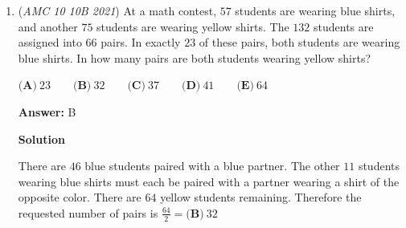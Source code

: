 \begin{enumerate}
 Note that by using the answer choices, we could automatically rule out 10.

 



\textbf{Solution 3}

Since there are an equal number of juniors and seniors on the debate team, suppose there are $x$ juniors and $x$ seniors. This number represents $25\% =\frac{1}{4}$ of the juniors and $10\%= \frac{1}{10}$ of the seniors, which tells us that there are $4x$ juniors and $10x$ seniors. There are $28$ juniors and seniors in the program altogether, so we get 
 \[10x+4x=28,\]
 \[14x=28,\]
 \[x=2.\]Which means there are $4x=8$ juniors on the debate team, $\boxed{\text{(C)} \, 8}$.

 



\textbf{Solution 4 (Elimination)}

The amount of juniors must be a multiple of $4$, since exactly $\frac{1}{4}$ of the students are on the debate team. Thus, we can immediately see that $\boxed{C}$ and $\boxed{E}$ are the only possibilities for the number of juniors. However, if there are $20$ juniors, then there are $8$ seniors, so it is not true that $1/10$ of the seniors are on the debate team, since $\frac{1}{10} \cdot 8 = \frac{4}{5}$, which is not an integer. Thus, we conclude that there are $8$ juniors, so the answer is $\boxed{C}$.

 


	\item (\textit{AMC 10 10B 2021}) At a math contest, $57$ students are wearing blue shirts, and another $75$ students are wearing yellow shirts. The $132$ students are assigned into $66$ pairs. In exactly $23$ of these pairs, both students are wearing blue shirts. In how many pairs are both students wearing yellow shirts?


 $\textbf{(A)} ~23 \qquad\textbf{(B)} ~32 \qquad\textbf{(C)} ~37 \qquad\textbf{(D)} ~41 \qquad\textbf{(E)} ~64$

 \textbf{Answer: }B



\textbf{Solution}

There are $46$ blue students paired with a blue partner. The other $11$ students wearing blue shirts must each be paired with a partner wearing a shirt of the opposite color. There are $64$ yellow students remaining. Therefore the requested number of pairs is $\frac{64}{2}=\boxed{\textbf{(B)} ~32}$




\end{enumerate}
